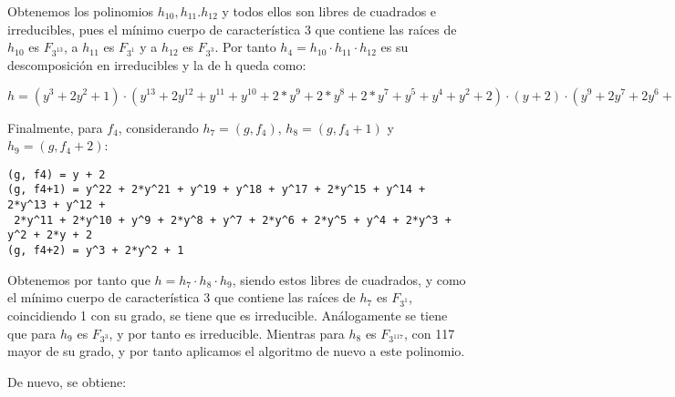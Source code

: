 \documentclass[a4paper]{article}
\begin{document}
Obtenemos los polinomios $h_{10}, h_{11}. h_{12}$ y todos ellos son libres de cuadrados e irreducibles, pues el mínimo cuerpo de característica 3 que contiene las raíces de $h_{10}$ es $F_{3^{13}}$, a $h_{11}$ es $F_{3^{1}}$ y a $h_{12}$ es $F_{3^{3}}$. Por tanto $h_4=h_{10}\cdot h_{11}\cdot h_{12}$ es su descomposición en irreducibles y la de h queda como:

$h = (y^3 + 2y^2 + 1)\cdot (y^{13} + 2y^{12} + y^{11} + y^{10} + 2*y^9 + 2*y^8 + 2*y^7 + y^5 + y^4 + y^2 + 2)\cdot (y+2)\cdot (y^9 + 2y^7 + 2y^6 + 2y^5 + 2y^3 + y + 1)$

Finalmente, para $f_4$, considerando $h_7=(g, f_4)$, $h_8=(g, f_4+1)$ y $h_9=(g, f_4+2)$:

\begin{verbatim}
(g, f4) = y + 2
(g, f4+1) = y^22 + 2*y^21 + y^19 + y^18 + y^17 + 2*y^15 + y^14 + 2*y^13 + y^12 +
 2*y^11 + 2*y^10 + y^9 + 2*y^8 + y^7 + 2*y^6 + 2*y^5 + y^4 + 2*y^3 + y^2 + 2*y + 2
(g, f4+2) = y^3 + 2*y^2 + 1
\end{verbatim}

Obtenemos por tanto que $h=h_7\cdot h_8\cdot h_9$, siendo estos libres de cuadrados, y como el mínimo cuerpo de característica 3 que contiene las raíces de $h_7$ es $F_{3^{1}}$, coincidiendo 1 con su grado, se tiene que es irreducible. Análogamente se tiene que para $h_9$ es $F_{3^{3}}$, y por tanto es irreducible. Mientras para $h_8$ es $F_{3^{117}}$, con 117 mayor de su grado, y por tanto aplicamos el algoritmo de nuevo a este polinomio.

De nuevo, se obtiene:
\end{document}
